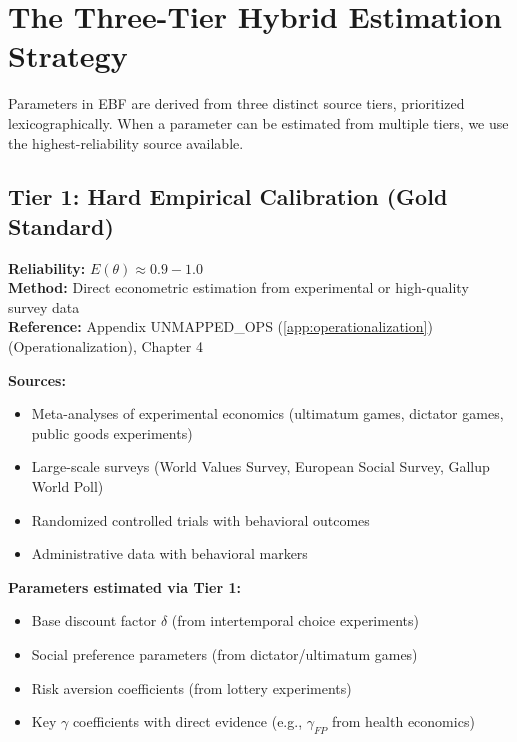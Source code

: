 \documentclass[11pt,a4paper]{article}
\theoremstyle{definition}
\begin{document}

\section{The Three-Tier Hybrid Estimation Strategy}
\label{sec:bbb-three-tier}

Parameters in EBF are derived from three distinct source tiers, 
prioritized lexicographically. When a parameter can be estimated from 
multiple tiers, we use the highest-reliability source available.

\subsection{Tier 1: Hard Empirical Calibration (Gold Standard)}

\begin{tcolorbox}[colback=green!5!white, colframe=green!75!black]
\textbf{Reliability:} $E(\theta) \approx 0.9 - 1.0$ \\
\textbf{Method:} Direct econometric estimation from experimental or high-quality survey data \\
\textbf{Reference:} Appendix UNMAPPED_OPS (\ref{app:operationalization}) (Operationalization), Chapter 4
\end{tcolorbox}

\textbf{Sources:}
\begin{itemize}
    \item Meta-analyses of experimental economics (ultimatum games, dictator games, 
    public goods experiments)
    \item Large-scale surveys (World Values Survey, European Social Survey, 
    Gallup World Poll)
    \item Randomized controlled trials with behavioral outcomes
    \item Administrative data with behavioral markers
\end{itemize}

\textbf{Parameters estimated via Tier 1:}
\begin{itemize}
    \item Base discount factor $\delta$ (from intertemporal choice experiments)
    \item Social preference parameters (from dictator/ultimatum games)
    \item Risk aversion coefficients (from lottery experiments)
    \item Key $\gamma$ coefficients with direct evidence (e.g., $\gamma_{FP}$ from 
    health economics)
\end{itemize}
\end{document}
